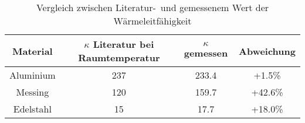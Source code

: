 \begin{table}[h!]
\begin{center}
\begin{tabular}{c|c|c|c}
	Material & $\kappa$ Literatur bei Raumtemperatur & $\kappa$ gemessen & Abweichung \\
\hline
	Aluminium & 237 & 233.4 & +1.5\% \\
	Messing & 120 & 159.7 & +42.6\% \\
	Edelstahl & 15 & 17.7 & +18.0\%\\
\end{tabular}
\end{center}
\caption[Vergleich zwischen Literatur- und gemessenem Wert der Wärmeleitfähigkeit]{Vergleich zwischen Literatur-\footnotemark\ und gemessenem Wert der Wärmeleitfähigkeit}
\end{table}
